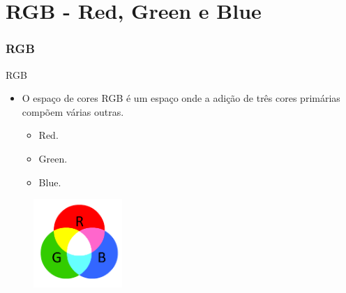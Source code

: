 \documentclass{beamer}
\begin{document}
\section{RGB - Red, Green e Blue}
\begin{frame}
\frametitle{RGB}

		\begin{block}{RGB}
			\begin{itemize}
				\item O espaço de cores RGB é um espaço onde a adição de três cores primárias compõem várias outras.
					\begin{itemize}
						\item Red.
						\item Green.
						\item Blue.
					\end{itemize}
			\end{itemize} 
		\end{block}
		
		\begin{figure}[!h]
			\begin{center}
				\includegraphics[width=0.3\textwidth]{Figures/PRGB}
			\end{center}
		\end{figure}
	
\end{frame}
\end{document}
